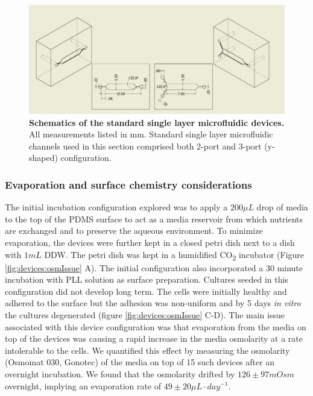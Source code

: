       \begin{figure}[h]
           \centering
            \includegraphics[width=14.5cm]{chapter4/figures/channelDimensions/dimensions.jpg}
            \caption[Schematics of the standard single layer microfluidic devices]{\textbf{Schematics of the standard single layer microfluidic devices.} All measurements listed in mm. Standard single layer microfluidic channels used in this section comprised both 2-port and 3-port (y-shaped) configuration.}
            \label{fig:devices:basicDimensions}
     \end{figure}



        \subsubsection{Evaporation and surface chemistry considerations}
        The initial incubation configuration explored was to apply a \(200 \mu L\) drop of media to the top of the PDMS surface to act as a media reservoir from which nutrients are exchanged and to preserve the aqueous environment. To minimize evaporation, the devices were further kept in a closed petri dish next to a dish with \(1 mL\) DDW. The petri dish was kept in a humidified CO\textsubscript{2} incubator (Figure \ref{fig:devices:osmIssue} A). The initial configuration also incorporated a 30 minute incubation with PLL solution as surface preparation. Cultures seeded in this configuration did not develop long term. The cells were initially healthy and adhered to the surface but the adhesion was non-uniform and by 5 days \textit{in vitro} the cultures degenerated (figure \ref{fig:devices:osmIssue} C-D). The main issue associated with this device configuration was that evaporation from the media on top of the devices was causing a rapid increase in the media osmolarity at a rate intolerable to the cells. We quantified this effect by measuring the osmolarity (Osmomat 030, Gonotec) of the media on top of 15 such devices after an overnight incubation. We found that the osmolarity drifted by \(126 \pm 97 mOsm\) overnight, implying an evaporation rate of \(49 \pm 20 \mu L\cdot day^{-1}\).

